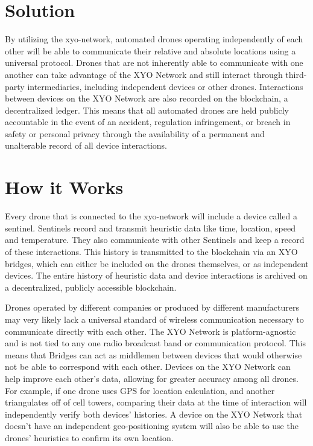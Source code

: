 \documentclass{article}
\begin{document}
\section {Solution}
By utilizing the \Gls{xyo-network}, automated drones operating independently of each other will be able to communicate their relative and absolute locations using a universal protocol. Drones that are not inherently able to communicate with one another can take advantage of the XYO Network and still interact through third-party intermediaries, including independent devices or other drones. Interactions between devices on the XYO Network are also recorded on the blockchain, a decentralized ledger. This means that all automated drones are held publicly accountable in the event of an accident, regulation infringement, or breach in safety or personal privacy through the availability of a permanent and unalterable record of all device interactions.

\section {How it Works}
Every drone that is connected to the \Gls{xyo-network} will include a device called a \Gls{sentinel}. Sentinels record and transmit \gls{heuristic} data like time, location, speed and temperature. They also communicate with other Sentinels and keep a record of these interactions. This history is transmitted to the blockchain via an XYO \Glspl{bridge}, which can either be included on the drones themselves, or as independent devices. The entire history of heuristic data and device interactions is archived on a decentralized, publicly accessible blockchain.

Drones operated by different companies or produced by different manufacturers may very likely lack a universal standard of wireless communication necessary to communicate directly with each other. The XYO Network is platform-agnostic and is not tied to any one radio broadcast band or communication protocol. This means that Bridges can act as middlemen between devices that would otherwise not be able to correspond with each other. Devices on the XYO Network can help improve each other's data, allowing for greater \gls{accuracy} among all drones. For example, if one drone uses GPS for location calculation, and another triangulates off of cell towers, comparing their data at the time of interaction will independently verify both devices' histories. A device on the XYO Network that doesn't have an independent geo-positioning system will also be able to use the drones' heuristics to confirm its own location.
\end{document}
